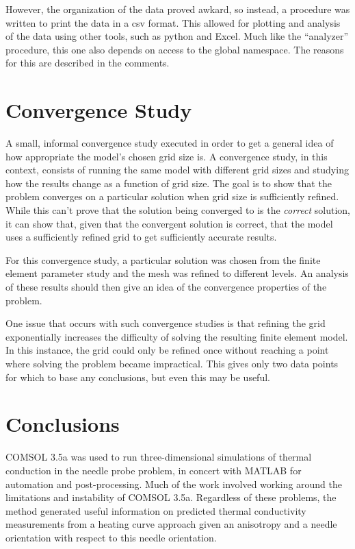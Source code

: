 However, the organization of the data proved awkard, so instead, a procedure was
written to print the data in a csv format. This allowed for plotting and
analysis of the data using other tools, such as python and Excel. Much like the
``analyzer'' procedure, this one also depends on access to the global namespace.
The reasons for this are described in the comments.

\section{Convergence Study}

A small, informal convergence study executed in order to get a general idea
of how appropriate the model's chosen grid size is. A convergence study, in this
context, consists of running the same model with different grid sizes and
studying how the results change as a function of grid size.  The goal is to show
that the problem converges on a particular solution when grid size is
sufficiently refined. While this can't prove that the solution being converged
to is the \emph{correct} solution, it can show that, given that the convergent
solution is correct, that the model uses a sufficiently refined grid to get
sufficiently accurate results.

For this convergence study, a particular solution was chosen from the finite
element parameter study and the mesh was refined to different levels. An
analysis of these results should then give an idea of the convergence properties
of the problem.

One issue that occurs with such convergence studies is that refining the grid
exponentially increases the difficulty of solving the resulting finite element
model. In this instance, the grid could only be refined once without reaching
a point where solving the problem became impractical. This gives only two data
points for which to base any conclusions, but even this may be useful.

\section{Conclusions}

COMSOL 3.5a was used to run three-dimensional simulations of thermal conduction
in the needle probe problem, in concert with MATLAB for automation and
post-processing. Much of the work involved working around the limitations and
instability of COMSOL 3.5a. Regardless of these problems, the method generated
useful information on predicted thermal conductivity measurements from a heating
curve approach given an anisotropy and a needle orientation with respect to this
needle orientation.
